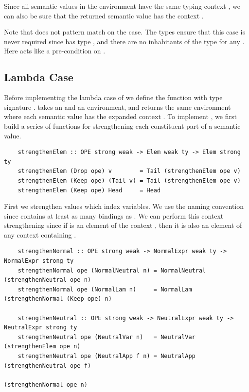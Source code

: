 Since all semantic values in the environment have the same typing context , we can also be sure that the returned semantic value has the context .

Note that  does not pattern match on the  case. The types ensure that this case is never required since  has type , and there are no inhabitants of the type  for any . Here  acts like a pre-condition on .


\subsection{Lambda Case}
\label{subsect:typedEvalLamCase}

Before implementing the lambda case of  we define the function  with type signature .  takes an  and an environment, and returns the same environment where each semantic value has the expanded context . To implement , we first build a series of functions for strengthening each constituent part of a semantic value.

\begin{lstlisting}
    strengthenElem :: OPE strong weak -> Elem weak ty -> Elem strong ty
    strengthenElem (Drop ope) v        = Tail (strengthenElem ope v)
    strengthenElem (Keep ope) (Tail v) = Tail (strengthenElem ope v)
    strengthenElem (Keep ope) Head     = Head
\end{lstlisting}

First we strengthen  values which index variables. We use the naming convention  since  contains at least as many bindings as . 
We can perform this context strengthening since if  is an element of the context , then it is also an element of any context  containing .



\begin{lstlisting} 
    strengthenNormal :: OPE strong weak -> NormalExpr weak ty -> NormalExpr strong ty
    strengthenNormal ope (NormalNeutral n) = NormalNeutral (strengthenNeutral ope n)
    strengthenNormal ope (NormalLam n)     = NormalLam (strengthenNormal (Keep ope) n)

    strengthenNeutral :: OPE strong weak -> NeutralExpr weak ty -> NeutralExpr strong ty
    strengthenNeutral ope (NeutralVar n)   = NeutralVar (strengthenElem ope n)
    strengthenNeutral ope (NeutralApp f n) = NeutralApp (strengthenNeutral ope f) 
                                                        (strengthenNormal ope n) 

\end{lstlisting}

